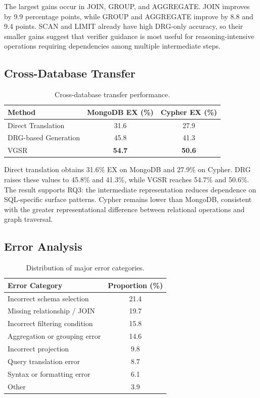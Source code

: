 \documentclass[conference]{IEEEtran}
\begin{document}
The largest gains occur in JOIN, GROUP, and AGGREGATE. JOIN improves by 9.9 percentage points, while GROUP and AGGREGATE improve by 8.8 and 9.4 points. SCAN and LIMIT already have high DRG-only accuracy, so their smaller gains suggest that verifier guidance is most useful for reasoning-intensive operations requiring dependencies among multiple intermediate steps.

\subsection{Cross-Database Transfer}
\begin{table}[t]
\centering
\caption{Cross-database transfer performance.}
\label{tab:transfer_results}
\begin{tabular}{lcc}
\toprule
Method & MongoDB EX (\%) & Cypher EX (\%)\\
\midrule
Direct Translation & 31.6 & 27.9\\
DRG-based Generation & 45.8 & 41.3\\
VGSR & \textbf{54.7} & \textbf{50.6}\\
\bottomrule
\end{tabular}
\end{table}

Direct translation obtains 31.6\% EX on MongoDB and 27.9\% on Cypher. DRG raises these values to 45.8\% and 41.3\%, while VGSR reaches 54.7\% and 50.6\%. The result supports RQ3: the intermediate representation reduces dependence on SQL-specific surface patterns. Cypher remains lower than MongoDB, consistent with the greater representational difference between relational operations and graph traversal.

\subsection{Error Analysis}
\begin{table}[t]
\centering
\caption{Distribution of major error categories.}
\label{tab:error_distribution}
\begin{tabular}{lc}
\toprule
Error Category & Proportion (\%)\\
\midrule
Incorrect schema selection & 21.4\\
Missing relationship / JOIN & 19.7\\
Incorrect filtering condition & 15.8\\
Aggregation or grouping error & 14.6\\
Incorrect projection & 9.8\\
Query translation error & 8.7\\
Syntax or formatting error & 6.1\\
Other & 3.9\\
\bottomrule
\end{tabular}
\end{table}
\end{document}
